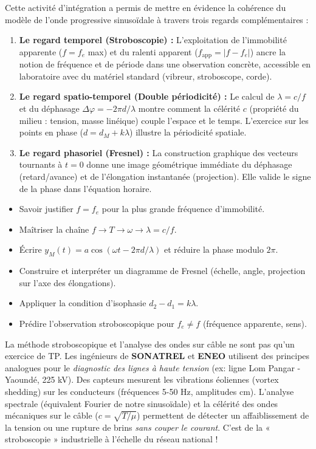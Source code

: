 \documentclass[11pt]{article}
\newcounter{popsec}
\newcounter{popsub}
\newcommand{\courssub}[1]{%
  \stepcounter{popsub}%
  \par\vspace{9pt}\noindent{\popxbold\fontsize{11.5}{13}\selectfont\color{popink}{\color{poporange}\thepopsec.\thepopsub}\hspace{6pt}#1}\par\nopagebreak\vspace{4pt}
}
\begin{document}
\courssub{Bilan de l'activité}
Cette activité d'intégration a permis de mettre en évidence la cohérence du modèle de l'onde progressive sinusoïdale à travers trois regards complémentaires :
\begin{enumerate}
    \item \textbf{Le regard temporel (Stroboscopie) :} L'exploitation de l'immobilité apparente ($f = f_e$ max) et du ralenti apparent ($f_{\text{app}} = |f-f_e|$) ancre la notion de fréquence et de période dans une observation concrète, accessible en laboratoire avec du matériel standard (vibreur, stroboscope, corde).
    \item \textbf{Le regard spatio-temporel (Double périodicité) :} Le calcul de $\lambda = c/f$ et du déphasage $\Delta\varphi = -2\pi d/\lambda$ montre comment la célérité $c$ (propriété du milieu : tension, masse linéique) couple l'espace et le temps. L'exercice sur les points en phase ($d = d_M + k\lambda$) illustre la périodicité spatiale.
    \item \textbf{Le regard phasoriel (Fresnel) :} La construction graphique des vecteurs tournants à $t=0$ donne une image géométrique immédiate du déphasage (retard/avance) et de l'élongation instantanée (projection). Elle valide le signe de la phase dans l'équation horaire.
\end{enumerate}
\begin{aretenir}
\begin{itemize}
    \item Savoir justifier $f = f_e$ pour la plus grande fréquence d'immobilité.
    \item Maîtriser la chaîne $f \to T \to \omega \to \lambda = c/f$.
    \item Écrire $y_M(t) = a\cos(\omega t - 2\pi d/\lambda)$ et réduire la phase modulo $2\pi$.
    \item Construire et interpréter un diagramme de Fresnel (échelle, angle, projection sur l'axe des élongations).
    \item Appliquer la condition d'isophasie $d_2 - d_1 = k\lambda$.
    \item Prédire l'observation stroboscopique pour $f_e \neq f$ (fréquence apparente, sens).
\end{itemize}
\end{aretenir}

\begin{savaistu}
La méthode stroboscopique et l'analyse des ondes sur câble ne sont pas qu'un exercice de TP. Les ingénieurs de \textbf{SONATREL} et \textbf{ENEO} utilisent des principes analogues pour le \emph{diagnostic des lignes à haute tension} (ex: ligne Lom Pangar - Yaoundé, 225 kV). Des capteurs mesurent les vibrations éoliennes (vortex shedding) sur les conducteurs (fréquences 5-50 Hz, amplitudes cm). L'analyse spectrale (équivalent Fourier de notre sinusoïdale) et la célérité des ondes mécaniques sur le câble ($c = \sqrt{T/\mu}$) permettent de détecter un affaiblissement de la tension ou une rupture de brins \emph{sans couper le courant}. C'est de la « stroboscopie » industrielle à l'échelle du réseau national !
\end{savaistu}
\end{document}
